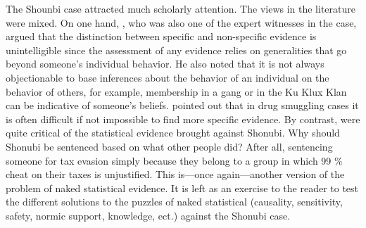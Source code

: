 \documentclass{article}
\begin{document}
 
 The Shounbi case attracted much scholarly attention. The views in the literature were mixed. On one hand, \cite{tillers97,tillers2005if}, who was also one of the expert witnesses in the case, argued that the distinction between specific and non-specific evidence is unintelligible since 
 the assessment of any evidence relies on generalities that go beyond someone's individual behavior.
  He also noted that it is not always objectionable to base inferences about the behavior of an individual on the behavior of others, for example, 
  membership in a gang or in the Ku Klux Klan can be indicative of someone's beliefs.
%  
\citet{izenman2000assessing} pointed out that in drug smuggling cases it is often difficult if not impossible to find more specific evidence. 
 By contrast,  \citet{colyvan2001crime} were quite critical of the statistical evidence brought against Shonubi. Why should Shonubi be sentenced based on what other people did? After all, sentencing someone for tax evasion simply because they belong to a group in which 99 \% cheat on their taxes is unjustified. This is---once again---another version of the problem of naked statistical evidence.
%
%
It is left as an exercise to the reader to test the different solutions to the puzzles of naked statistical (causality, sensitivity, safety, normic support, knowledge, ect.) against the Shonubi case. 
\end{document}
